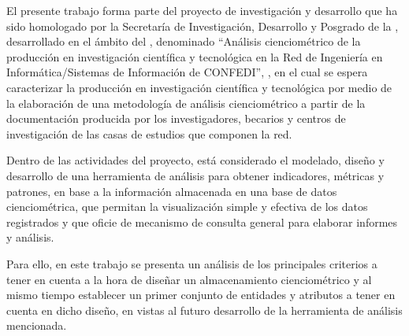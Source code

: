 El presente trabajo forma parte del proyecto de investigación y desarrollo que ha sido homologado por la Secretaría de Investigación, Desarrollo y Posgrado de la \utn, desarrollado en el ámbito del \cids, denominado ``Análisis cienciométrico de la producción en investigación científica y tecnológica en la Red de Ingeniería en Informática/Sistemas de Información de CONFEDI'', \proyecto, en el cual se espera caracterizar la producción en investigación científica y tecnológica por medio de la elaboración de una metodología de análisis cienciométrico a partir de la documentación producida por los investigadores, becarios y centros de investigación de las casas de estudios que componen la red.

Dentro de las actividades del proyecto, está considerado el modelado, diseño y desarrollo de una herramienta de análisis para obtener indicadores, métricas y patrones, en base a la información almacenada en una base de datos cienciométrica, que permitan la visualización simple y efectiva de los datos registrados y que oficie de mecanismo de consulta general para elaborar informes y análisis.

Para ello, en este trabajo se presenta un análisis de los principales criterios a tener en cuenta a la hora de diseñar un almacenamiento cienciométrico y al mismo tiempo establecer un primer conjunto de entidades y atributos a tener en cuenta en dicho diseño, en vistas al futuro desarrollo de la herramienta de análisis mencionada.



